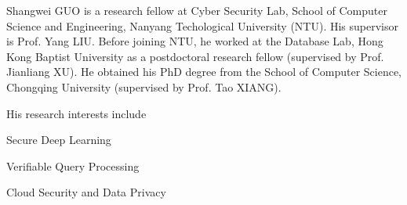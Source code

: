 


\begin{cvparagraph}
	
	Shangwei GUO is a research fellow at Cyber Security Lab, School of Computer Science and Engineering, Nanyang Techological University (NTU). His supervisor is Prof. Yang LIU. Before joining NTU, he worked at the Database Lab, Hong Kong Baptist University as a postdoctoral research fellow (supervised by Prof. Jianliang XU). He obtained his PhD degree from the School of Computer Science, Chongqing University (supervised by Prof. Tao XIANG). 
	
	\indent His research interests include
	\vspace{0.2cm}
	{
		\begin{cvitems}
			\item{Secure Deep Learning}
			\item{Verifiable Query Processing}
			\item{Cloud Security and Data Privacy}
		\end{cvitems}
	}
\end{cvparagraph}
\vspace{-0.2cm}